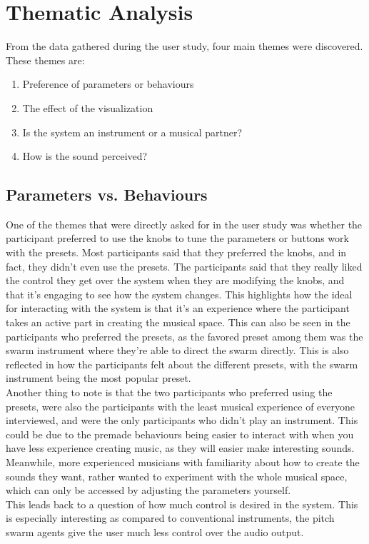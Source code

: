 \documentclass[a4paper,english]{report}
\begin{document}
	\section{Thematic Analysis}
	\iffalse
	From the data gathered during the user study, four main themes were discovered. These themes are:
	\begin{samepage}\begin{enumerate}
		\item Preference of parameters or behaviours
		\item The effect of the visualization
		\item Is the system an instrument or a musical partner? 
		\item How is the sound perceived?
	\end{enumerate}\end{samepage}
	\subsection{Parameters vs. Behaviours}
	One of the themes that were directly asked for in the user study was whether the participant preferred to use the knobs to tune the parameters or buttons work with the presets. Most participants said that they preferred the knobs, and in fact, they didn't even use the presets. The participants said that they really liked the control they get over the system when they are modifying the knobs, and that it's engaging to see how the system changes. This highlights how the ideal for interacting with the system is that it's an experience where the participant takes an active part in creating the musical space. This can also be seen in the participants who preferred the presets, as the favored preset among them was the swarm instrument where they're able to direct the swarm directly. This is also reflected in how the participants felt about the different presets, with the swarm instrument being the most popular preset.\\
	Another thing to note is that the two participants who preferred using the presets, were also the participants with the least musical experience of everyone interviewed, and were the only participants who didn't play an instrument. This could be due to the premade behaviours being easier to interact with when you have less experience creating music, as they will easier make interesting sounds. Meanwhile, more experienced musicians with familiarity about how to create the sounds they want, rather wanted to experiment with the whole musical space, which can only be accessed by adjusting the parameters yourself.\\
	This leads back to a question of how much control is desired in the system. This is especially interesting as compared to conventional instruments, the pitch swarm agents give the user much less control over the audio output. 
\end{document}
